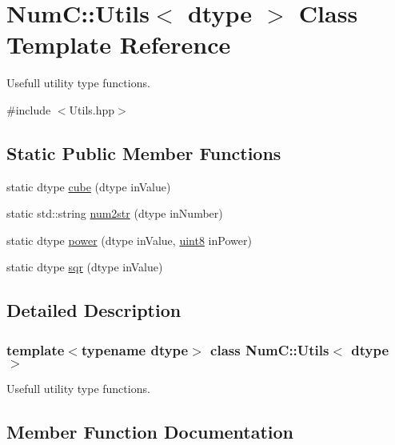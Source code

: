 \hypertarget{class_num_c_1_1_utils}{}\section{NumC\+:\+:Utils$<$ dtype $>$ Class Template Reference}
\label{class_num_c_1_1_utils}


Usefull utility type functions.  




{\ttfamily \#include $<$Utils.\+hpp$>$}

\subsection*{Static Public Member Functions}
\begin{DoxyCompactItemize}
\item 
static dtype \mbox{\hyperlink{class_num_c_1_1_utils_ad0b49acb822d10734c238253be61c0ca}{cube}} (dtype in\+Value)
\item 
static std\+::string \mbox{\hyperlink{class_num_c_1_1_utils_a74afc2e3bb44cf816b45db1e0e5a726b}{num2str}} (dtype in\+Number)
\item 
static dtype \mbox{\hyperlink{class_num_c_1_1_utils_a15993a5fe899240616150c862e39be20}{power}} (dtype in\+Value, \mbox{\hyperlink{namespace_num_c_a60b2e2f49e1ff61059731c154e560869}{uint8}} in\+Power)
\item 
static dtype \mbox{\hyperlink{class_num_c_1_1_utils_a3fe9ffd53cc0f54fd961350bf45d60ae}{sqr}} (dtype in\+Value)
\end{DoxyCompactItemize}


\subsection{Detailed Description}
\subsubsection*{template$<$typename dtype$>$\newline
class Num\+C\+::\+Utils$<$ dtype $>$}

Usefull utility type functions. 

\subsection{Member Function Documentation}
\mbox{\label{class_num_c_1_1_utils_ad0b49acb822d10734c238253be61c0ca}} 
